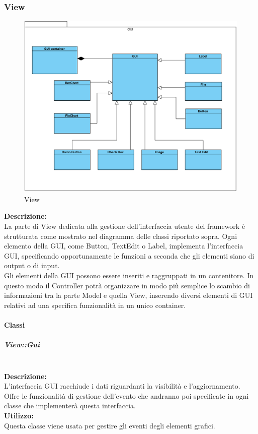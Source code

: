 \subsubsection{View}
\begin{figure}[H]
	\centering
	\includegraphics[width=14cm]{diagrammi_img/classi_e_package/gui_classes.png}
	\caption{View}
\end{figure}
\textbf{Descrizione:}\\
La parte di View dedicata alla gestione dell'interfaccia utente del framework è strutturata come mostrato nel diagramma delle classi riportato sopra.
Ogni elemento della GUI, come Button, TextEdit o Label, implementa l'interfaccia GUI, specificando opportunamente le funzioni a seconda che gli elementi siano di output o di input.\\
Gli elementi della GUI possono essere inseriti e raggruppati in un contenitore. In questo modo il Controller potrà organizzare in modo più semplice lo scambio di informazioni tra la parte Model e quella View, inserendo diversi elementi di GUI relativi ad una specifica funzionalità in un unico container.

\paragraph{Classi}\mbox{}

\subparagraph{View\-::Gui}\label{gui}\mbox{}\\
\textbf{Descrizione:}\\
L'interfaccia GUI racchiude i dati riguardanti la visibilità e l'aggiornamento. Offre le funzionalità di gestione dell'evento che andranno poi specificate in ogni classe che implementerà questa interfaccia.\\
\textbf{Utilizzo:}\\
Questa classe viene usata per gestire gli eventi degli elementi grafici.


